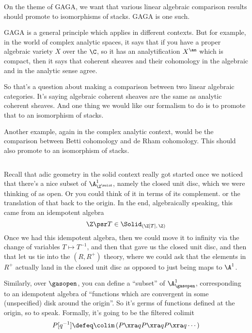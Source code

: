 \begin{example}
  On the theme of GAGA, we want that various linear algebraic comparison results should promote to isomorphisms of stacks. GAGA is one such.
  
  GAGA is a general principle which applies in different contexts. But for example, in the world of complex analytic spaces, it says that if you have a proper algebraic variety $X$ over the $\C$, so it has an analytification $X^\an$ which is compact, then it says that coherent sheaves and their cohomology in the algebraic and in the analytic sense agree.
  
  So that's a question about making a comparison between two linear algebraic categories. It's saying algebraic coherent sheaves are the same as analytic coherent sheaves. And one thing we would like our formalism to do is to promote that to an isomorphism of stacks.

  Another example, again in the complex analytic context, would be the comparison between Betti cohomology and de Rham cohomology. This should also promote to an isomorphism of stacks.
\end{example}

\subsection{}
Recall that adic geometry in the solid context really got started once we noticed that there's a nice subset of $\A^1_{\Z^\solid}$, namely the closed unit disc, which we were thinking of as open. Or you could think of it in terms of its complement. or the translation of that back to the origin. In the end, algebraically speaking, this came from an idempotent algebra
\[ \Z\psr T \in \Solid_{(\Z[T],\,\Z)} \]
Once we had this idempotent algebra, then we could move it to infinity via the change of variables $T\mapsto T^{-1}$, and then that gave us the closed unit disc, and then that let us tie into the $(R,R^+)$ theory, where we could ask that the elements in $R^+$ actually land in the closed unit disc as opposed to just being maps to $\A^1$.

Similarly, over $\gasopen$, you can define a ``subset'' of $\A^1_{\gasopen}$, corresponding to an idempotent algebra of ``functions which are convergent in some (unspecified) disk around the origin''. So it's germs of functions defined at the origin, so to speak. Formally, it's going to be the filtered colimit
\[ P[q^{-1}] \defeq \colim\left(P \xra q P \xra q P \xra q \dotsb \right) \]

